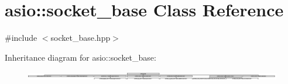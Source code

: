 \hypertarget{classasio_1_1socket__base}{}\section{asio\+:\+:socket\+\_\+base Class Reference}
\label{classasio_1_1socket__base}


{\ttfamily \#include $<$socket\+\_\+base.\+hpp$>$}

Inheritance diagram for asio\+:\+:socket\+\_\+base\+:\begin{figure}[H]
\begin{center}
\leavevmode
\includegraphics[height=0.368421cm]{classasio_1_1socket__base}
\end{center}
\end{figure}
